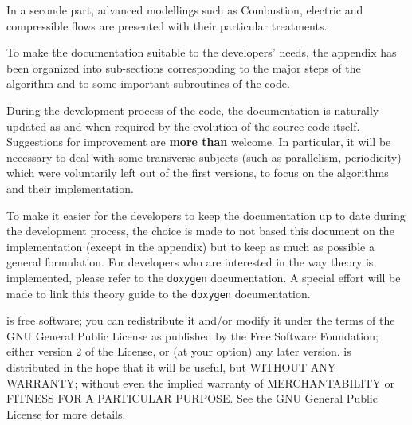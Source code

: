 In a seconde part, advanced modellings such as Combustion, electric and compressible flows
 are presented with their particular treatments.

To make the documentation suitable to the developers' needs, the appendix
has been organized into sub-sections corresponding to the major steps of the
algorithm and to some important subroutines of the code.

During the development process of the code, the documentation is naturally
updated as and when required by the evolution of the source code itself.
Suggestions for improvement are \textbf{more than} welcome. In particular,
it will be necessary to deal with some transverse subjects
(such as parallelism, periodicity) which were voluntarily left out of
the first versions, to focus on the algorithms and their implementation.

To make it easier for the developers to keep the documentation up to date
during the development process, the choice is made to not based this document
on the implementation (except in the appendix) but to keep as much as possible
a general formulation. For developers who are interested in the way theory is
implemented, please refer to the \texttt{doxygen} documentation.
A special effort will be made to link this theory guide to the \texttt{doxygen}
documentation.

\CS is free software; you can redistribute it
and/or modify it under the terms of the GNU General Public License
as published by the Free Software Foundation; either version 2 of
the License, or (at your option) any later version.
\CS is distributed in the hope that it will be
useful, but WITHOUT ANY WARRANTY; without even the implied warranty
of MERCHANTABILITY or FITNESS FOR A PARTICULAR PURPOSE.  See the
GNU General Public License for more details.

%

%
%
%
%
